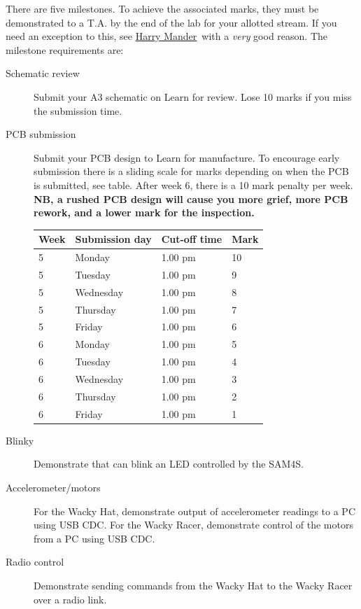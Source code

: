 \documentclass[11pt, a4paper]{article}
\makeatletter
\newcommand{\harry}{\href{mailto:harry.mander@pg.canterbury.ac.nz}{Harry Mander}}
\makeatother
\begin{document}
There are five milestones.  To achieve the associated marks, they must
be demonstrated to a T.A. by the end of the lab for your allotted
stream.  If you need an exception to this, see \harry\ with a
\emph{very} good reason.  The milestone requirements are:
%
\begin{description}
\item [Schematic review] Submit your A3 schematic on Learn for
  review.  Lose 10 marks if you miss the submission time.

\item [PCB submission] Submit your PCB design to Learn for
  manufacture.  To encourage early submission there is a sliding scale
  for marks depending on when the PCB is submitted, see table.  After
  week 6, there is a 10 mark penalty per week.  \textbf{NB, a rushed
    PCB design will cause you more grief, more PCB rework, and a lower
    mark for the inspection.}

  \begin{tabular}{llll}
    Week & Submission day & Cut-off time  & Mark \\ \hline
    5    & Monday       & 1.00 pm & 10 \\
    5    & Tuesday      & 1.00 pm & 9 \\
    5    & Wednesday    & 1.00 pm & 8 \\
    5    & Thursday     & 1.00 pm & 7 \\
    5    & Friday       & 1.00 pm & 6 \\
    6    & Monday       & 1.00 pm & 5 \\
    6    & Tuesday      & 1.00 pm & 4 \\
    6    & Wednesday    & 1.00 pm & 3 \\
    6    & Thursday     & 1.00 pm & 2 \\
    6    & Friday       & 1.00 pm & 1  \\
  \end{tabular}

\item [Blinky] Demonstrate that can blink an LED controlled by the SAM4S.

\item [Accelerometer/motors] For the Wacky Hat, demonstrate output of accelerometer
  readings to a PC using USB CDC.  For the Wacky Racer, demonstrate
  control of the motors from a PC using USB CDC.

\item[Radio control] Demonstrate sending commands from the Wacky Hat
  to the Wacky Racer over a radio link.
\end{description}
\end{document}
